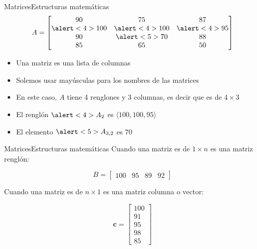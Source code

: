 \documentclass[spanish, c]{beamer}
\begin{document}
\begin{frame}{Matrices}{Estructuras matemáticas}
    $$A = 
    \begin{bmatrix}
        90 & 75 & 87 \\
        \alert<4>{100} & \alert<4>{100} & \alert<4>{95} \\
        90 & \alert<5>{70} & 88 \\
        85 & 65 & 50
    \end{bmatrix}
    $$

    \bigskip

    \begin{itemize}[<+->]
        \item Una \alert{matriz} es una lista de columnas\
        \item Solemos usar mayúsculas para los nombres de las matrices
        \item En este caso, $A$ tiene 4 renglones y 3 columnas, es decir que es de $4 \times 3$
        \item El renglón $\alert<4>{A_2}$ es $\langle 100, 100, 95 \rangle$
        \item El elemento $\alert<5>{A_{3,2}}$ es $70$
    \end{itemize}

\end{frame}

\begin{frame}{Matrices}{Estructuras matemáticas}
    Cuando una matriz es de $1 \times n$ es una matriz \alert{renglón}:

    $$B = \begin{bmatrix} 100 & 95 & 89 & 92 \end{bmatrix}$$ \pause

    Cuando una matriz es de $n \times 1$ es una matriz \alert{columna} o \alert{vector}:

    $$\mathbf{c} =
    \begin{bmatrix}
        100 \\ 91 \\ 95 \\ 98 \\ 85
    \end{bmatrix}$$

\end{frame}
\end{document}
